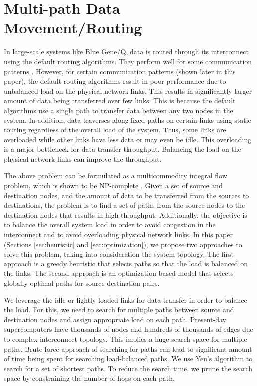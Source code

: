 \section{Multi-path Data Movement/Routing}
\label{sec:approach}

In large-scale systems like Blue Gene/Q, data is routed through its interconnect using the default routing algorithms. They perform well for some communication patterns \cite{Chen:BGQ}. However, for certain communication patterns (shown later in this paper), the default routing algorithms result in poor performance due to unbalanced load on the physical network links. This results in significantly larger amount of data being transferred over few links. This is because the default algorithms use a single path to transfer data between any two nodes in the system. In addition, data traverses along fixed paths on certain links using static routing regardless of the overall load of the system. Thus, some links are overloaded while other links have less data or may even be idle. This overloading is a major bottleneck for data transfer throughput. Balancing the load on the physical network links can improve the throughput. 

The above problem can be formulated as a multicommodity integral flow problem, which is shown to be NP-complete \cite{even1975}. Given a set of source and destination nodes, and the amount of data to be transferred from the sources to destinations, the problem is to find a set of paths from the source nodes to the destination nodes that results in high throughput. Additionally, the objective is to balance the overall system load in order to avoid congestion in the interconnect and to avoid overloading physical network links. In this paper (Sections \ref{sec:heuristic} and \ref{sec:optimization}), we propose two approaches to solve this problem, taking into consideration the system topology. The first approach is a greedy heuristic that selects paths so that the load is balanced on the links. The second approach is an optimization based model that selects globally optimal paths for source-destination pairs. 

We leverage the idle or lightly-loaded links for data transfer in order to balance the load. For this, we need to search for multiple paths between source and destination nodes and assign appropriate load on each path. Present-day supercomputers have thousands of nodes and hundreds of thousands of edges due to complex interconnect topology. This implies a huge search space for multiple paths. Brute-force approach of searching for paths can lead to significant amount of time being spent for searching load-balanced paths. We use Yen's algorithm \cite{Yen:Kpath} to search for a set of shortest paths. To reduce the search time, we prune the search space by constraining the number of hops on each path. 

